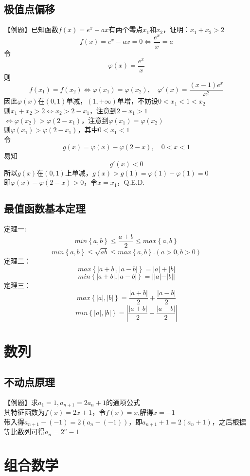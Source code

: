 \documentclass[UTF8]{ctexart}
\begin{document}
		\subsection{极值点偏移}
			【例题】已知函数$f(x)=e^x-ax$有两个零点$x_1$和$x_2$，证明：$x_1 +x_2 >2$\\
			\[f(x)=e^x-ax=0\Leftrightarrow \frac{e^x}{x}=a\]
			令\[\varphi(x)=\frac{e^x}{x}\]
			则\[f(x_1)=f(x_2)\Leftrightarrow\varphi(x_1)=\varphi(x_2),\quad \varphi'(x)=\frac{(x-1)e^x}{x^2}\]
			因此$\varphi(x)$在$(0,1)$单减，$(1,+\infty)$单增，不妨设$0<x_1<1<x_2$\\
			则$x_1+x_2>2\Leftrightarrow x_2>2-x_1$，注意到$2-x_1>1$\\
			$\Leftrightarrow\varphi(x_2)>\varphi(2-x_1)$，注意到$\varphi(x_1)=\varphi(x_2)$\\
			则$\varphi(x_1)>\varphi(2-x_1)$，其中$0<x_1<1$\\
			令\[g(x)=\varphi(x)-\varphi(2-x), \quad 0<x<1\]
			易知
			\[g'(x)<0\]
			所以$g(x)$在$(0,1)$上单减，$g(x)>g(1)=\varphi(1)-\varphi(1)=0$\\
			即$\varphi(x)-\varphi(2-x)>0$，令$x=x_1$，Q.E.D.
		\subsection{最值函数基本定理}
			定理一:
			\[min\left\{a,b\right\}\leq\frac{a+b}{2}\leq max\left\{a,b\right\}\]
			\[min\left\{a,b\right\}\leq\sqrt{ab}\leq max\left\{a,b\right\}.(a>0,b>0)\]
			\indent 定理二：
			\[max\left\{\left|a+b\right|,\left|a-b\right| \right\}=|a|+|b|\]
			\[min\left\{\left|a+b\right|,\left|a-b\right| \right\}=||a|-|b||\]
			\indent 定理三：
			\[max\left\{|a|,|b|\right\}=\frac{|a+b|}{2}+\frac{|a-b|}{2}\]
			\[min\left\{|a|,|b|\right\}=\left|\frac{|a+b|}{2}-\frac{|a-b|}{2}\right|\]
	\section{数列}
		\subsection{不动点原理}
			【例题】求$a_1 = 1 , a_{n+1}=2a_n +1$的通项公式\\
			其特征函数为$f(x)=2x+1$，令$f(x)=x$,解得$x=-1$\\
			带入得$a_{n+1}-(-1)=2(a_n-(-1))$，即$a_{n+1}+1=2(a_n+1)$，之后根据等比数列可得$a_n=2^n -1$
	\section{组合数学}
\end{document}
